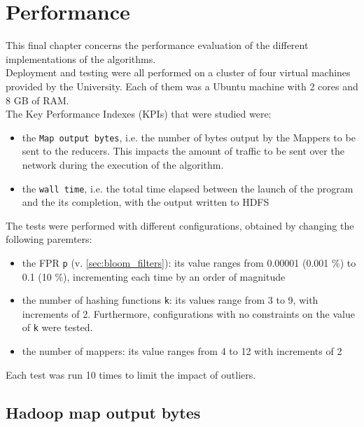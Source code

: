 %       
%
\chapter{Performance}\label{ch:performance}
This final chapter concerns the performance evaluation of the different implementations of the algorithms.\\
Deployment and testing were all performed on a cluster of four virtual machines provided by the University. Each of them was a Ubuntu machine with 2 cores and 8 GB of RAM.\\
The Key Performance Indexes (KPIs) that were studied were:
\begin{itemize}
	\item the \colorbox{gray!30}{\large \texttt{Map output bytes}}, i.e. the number of bytes output by the Mappers to be sent to the reducers. This impacts the amount of traffic to be sent over the network during the execution of the algorithm.
	\item the \colorbox{gray!30}{\large \texttt{wall time}}, i.e. the total time elapsed between the launch of the program and the its completion, with the output written to HDFS
\end{itemize}

The tests were performed with different configurations, obtained by changing the following paremters:\\
\begin{itemize}
	\item the FPR \colorbox{gray!30}{\large \texttt{p}} (v. \ref{sec:bloom_filters}): its value ranges from 0.00001 (0.001 \%) to 0.1 (10 \%), incrementing each time by an order of magnitude
	\item the number of hashing functions \colorbox{gray!30}{\large \texttt{k}}: its values range from 3 to 9, with increments of 2. Furthermore, configurations with no constraints on the value of \texttt{k} were tested.
	\item the number of mappers: its value ranges from 4 to 12 with increments of 2
\end{itemize}

Each test was run 10 times to limit the impact of outliers.%

\section{Hadoop map output bytes}

